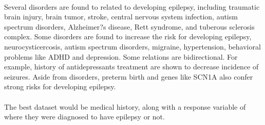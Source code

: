 \documentclass[10pt,letter]{article}
\begin{document}
\paragraph{} Several disorders are found to related to developing epilepsy, including traumatic brain injury, brain tumor, stroke, central nervous system infection, autism spectrum disorders, Alzheimer?s disease, Rett syndrome, and tuberous sclerosis complex. Some disorders are found to increase the risk for developing epilepsy, neurocysticercosis, autism spectrum disorders, migraine, hypertension, behavioral problems like ADHD and depression. Some relations are bidirectional. For example, history of antidepressants treatment are shown to decrease incidence of seizures. Aside from disorders, preterm birth and genes like SCN1A also confer strong risks for developing epilepsy.

\paragraph{} The best dataset would be medical history, along with a response variable of where they were diagnosed to have epilepsy or not.
\end{document}
